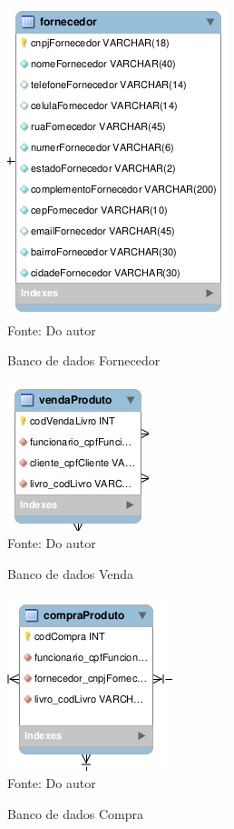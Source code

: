 \begin{figure}[H]
	\centering 
	\caption{Banco de dados Fornecedor}
	\label{banco_de_dados}
	\includegraphics[scale = 0.8]{imagens/bd-fornecedor.png}
	\\Fonte: Do autor
\end{figure}


\begin{figure}[H]
	\centering 
	\caption{Banco de dados Venda}
	\label{banco_de_dados}
	\includegraphics[scale = 0.8]{imagens/bd-venda.jpg}
	\\Fonte: Do autor
\end{figure}



\begin{figure}[H]
	\centering 
	\caption{Banco de dados Compra}
	\label{banco_de_dados}
	\includegraphics[scale = 0.8]{imagens/bd-compra.png}
	\\Fonte: Do autor
\end{figure}


